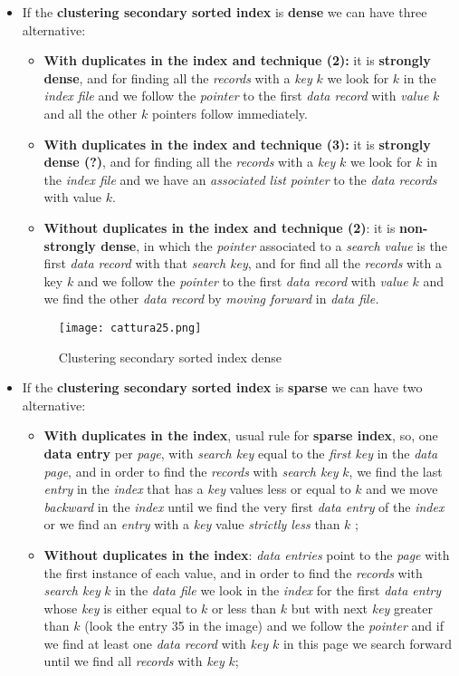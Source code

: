 \documentclass{article}
\begin{document}
\begin{itemize}
\item If the \textbf{clustering secondary sorted index} is \textbf{dense} we can have three alternative:
\begin{itemize}
\item \textbf{With duplicates in the index and technique (2):} it is \textbf{strongly dense}, and for finding all the \emph{records} with a \emph{key} $k$ we look for $k$ in the \emph{index file} and we follow the \emph{pointer} to the first \emph{data record} with \emph{value} $k$ and all the other $k$ pointers follow immediately.
\item \textbf{With duplicates in the index and technique (3):} it is \textbf{strongly dense (?)}, and for finding all the \emph{records} with a \emph{key} $k$ we look for $k$ in the \emph{index file} and we have an \emph{associated list pointer} to the \emph{data records} with value $k$.
\item \textbf{Without duplicates in the index and technique (2)}: it is \textbf{non-strongly dense}, in which the \emph{pointer} associated to a \emph{search value} is the first \emph{data record} with that \emph{search key}, and for find all the \emph{records} with a key $k$ and we follow the \emph{pointer} to the first \emph{data record} with \emph{value} $k$ and we find the other \emph{data record} by \emph{moving forward} in\emph{ data file.}
\end{itemize}
\begin{figure}[H]
  \centering
  \texttt{[image: cattura25.png]}
  \caption{Clustering secondary sorted index dense}
\end{figure}
\item If the \textbf{clustering secondary sorted index} is \textbf{sparse} we can have two alternative:
\begin{itemize}
\item \textbf{With duplicates in the index}, usual rule for \textbf{sparse index}, so, one\textbf{ data entry} per \emph{page}, with \emph{search key }equal to the \emph{first key} in the \emph{data page}, and in order to find the \emph{records} with \emph{search key} $k$, we find the last \emph{entry} in the \emph{index} that has a \emph{key} values less or equal to $k$ and we move \emph{backward} in the \emph{index} until we find the very first\emph{ data entry} of the \emph{index} or we find an \emph{entry} with a \emph{key} value \emph{strictly less }than $k$ ;
\item \textbf{Without duplicates in the index}: \emph{data entries} point to the \emph{page} with the first instance of each value, and in order to find the \emph{records} with \emph{search key} $k$ in the \emph{data file} we look in the \emph{index} for the first \emph{data entry} whose \emph{key} is either equal to $k$ or less than $k$ but with next \emph{key} greater than $k$ (look the entry 35 in the image) and we follow the \emph{pointer} and if we find at least one \emph{data record} with \emph{key} $k$ in this page we search forward until we find all \emph{records} with \emph{key} $k$;
\end{itemize}
\end{itemize}
\end{document}
